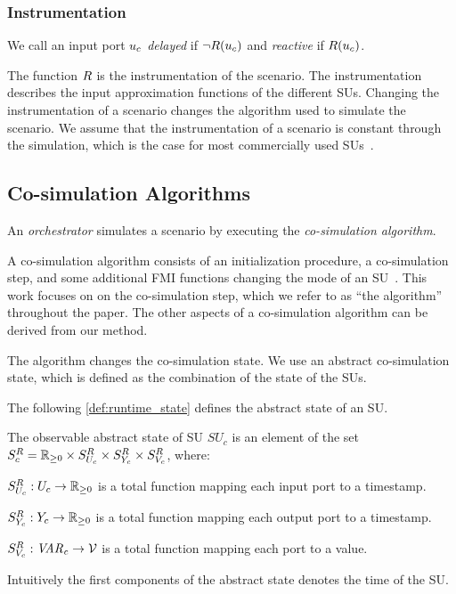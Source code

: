 \subsubsection{Instrumentation}
We call an input port $u_{c}$ \emph{delayed} if $\neg R(u_{c})$ and \emph{reactive} if $R(u_{c})$. 

The function $R$ is the instrumentation of the scenario.
The instrumentation describes the input approximation functions of the different SUs.
Changing the instrumentation of a scenario changes the algorithm used to simulate the scenario.
We assume that the instrumentation of a scenario is constant through the simulation, which is the case for most commercially used SUs~\cite{Gomes2018a}.

\subsection{Co-simulation Algorithms}\label{sc:cosimalgo}
An \emph{orchestrator} simulates a scenario by executing the \emph{co-simulation algorithm}.

A co-simulation algorithm consists of an initialization procedure, a co-simulation step, and some additional FMI functions changing the mode of an SU~\cite{FMI2014}.
This work focuses on on the co-simulation step, which we refer to as ``the algorithm'' throughout the paper. 
The other aspects of a co-simulation algorithm can be derived from our method.  

The algorithm changes the co-simulation state. 
We use an abstract co-simulation state, which is defined as the combination of the state of the SUs.

The following \cref{def:runtime_state} defines the abstract state of an SU.

\begin{definition}\label{def:runtime_state}
  The observable abstract state of SU $SU_c$ is an element of the set $S^{R}_{c} = \mathbb{R}_{\geq 0} \times S^{R}_{U_{c}} \times S^{R}_{Y_{c}} \times S^{R}_{V_c}$, where:
  \begin{compactitem}
    \item $S^{R}_{U_{c}} : U_{c} \to \mathbb{R}_{\geq 0}$ is a total function mapping each input port to a timestamp.  
    \item $S^{R}_{Y_{c}} : Y_{c} \to \mathbb{R}_{\geq 0}$ is a total function mapping each output port to a timestamp.  
    \item $S^{R}_{V_c} : \mathit{VAR_{c}} \to \mathcal{V}$ is a total function mapping each port to a value.  
  \end{compactitem}
  Intuitively the first components of the abstract state denotes the time of the SU.
\end{definition}

